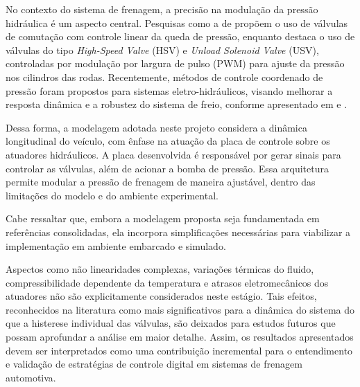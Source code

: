No contexto do sistema de frenagem, a precisão na modulação da pressão hidráulica é um aspecto central. Pesquisas como a de  propõem o uso de válvulas de comutação com controle linear da queda de pressão, enquanto  destaca o uso de válvulas do tipo \textit{High-Speed Valve} (HSV) e \textit{Unload Solenoid Valve} (USV), controladas por modulação por largura de pulso (PWM) para ajuste da pressão nos cilindros das rodas. Recentemente, métodos de controle coordenado de pressão foram propostos para sistemas eletro-hidráulicos, visando melhorar a resposta dinâmica e a robustez do sistema de freio, conforme apresentado em  e .

Dessa forma, a modelagem adotada neste projeto considera a dinâmica longitudinal do veículo, com ênfase na atuação da placa de controle sobre os atuadores hidráulicos. A placa desenvolvida é responsável por gerar sinais para controlar as válvulas, além de acionar a bomba de pressão. Essa arquitetura permite modular a pressão de frenagem de maneira ajustável, dentro das limitações do modelo e do ambiente experimental.

Cabe ressaltar que, embora a modelagem proposta seja fundamentada em referências consolidadas, ela incorpora simplificações necessárias para viabilizar a implementação em ambiente embarcado e simulado.  Aspectos como não linearidades complexas, variações térmicas do fluido, compressibilidade dependente da temperatura e atrasos eletromecânicos dos atuadores não são explicitamente considerados neste estágio. Tais efeitos, reconhecidos na literatura como mais significativos para a dinâmica do sistema do que a histerese individual das válvulas, são deixados para estudos futuros que possam aprofundar a análise em maior detalhe. Assim, os resultados apresentados devem ser interpretados como uma contribuição incremental para o entendimento e validação de estratégias de controle digital em sistemas de frenagem automotiva.


